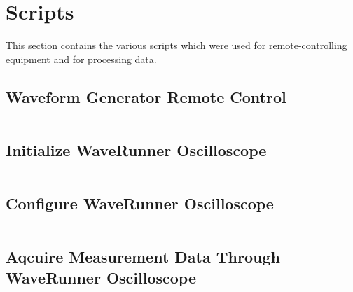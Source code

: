\chapter{Scripts}
\label{app:chap:scripts}

This   section   contains   the   various  scripts   which   were   used   for
remote-controlling equipment and for processing data.

\section{Waveform Generator Remote Control}
\label{sec:app:33120A}
\inputminted{python}{code/33120A.py}

\section{Initialize WaveRunner Oscilloscope}
\label{sec:app:waveRunner:initialize}
\inputminted{python}{code/initWaveRunner.py}

\section{Configure WaveRunner Oscilloscope}
\label{sec:app:waveRunner:config}
\inputminted{python}{code/configWaveRunner.py}

\section{Aqcuire Measurement Data Through WaveRunner Oscilloscope}
\label{sec:app:waveRunner:acquire}
\inputminted{python}{code/acquireWaveRunnerData.py}

